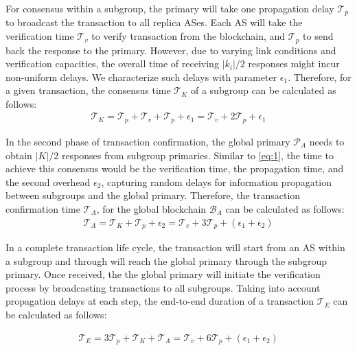\documentclass[conference]{IEEEtran}
\begin{document}
For consensus within a subgroup, the primary will take one propagation delay $\mathcal{T}_{p}$ to broadcast the transaction to all replica ASes. Each AS will take the verification time $\mathcal{T}_{v}$ to verify transaction from the blockchain, and $\mathcal{T}_{p}$ to send back the response to the primary. However, due to varying link conditions and verification capacities, the overall time of receiving $|k_{i}|/2$ responses might incur non-uniform delays. We characterize such delays with parameter  $\epsilon_{1}$. Therefore, for a given transaction, the consensus time $\mathcal{T}_{K}$ of a subgroup can be calculated as follows: 
\begin{align} \label{eq:1}
    \mathcal{T}_{K} = \mathcal{T}_{p} +  \mathcal{T}_{v} + \mathcal{T}_{p} + \epsilon_{1} = \mathcal{T}_{v} + 2\mathcal{T}_{p} + \epsilon_{1}
\end{align}


In the second phase of transaction confirmation, the global primary $\mathcal{P}_{A}$ needs to obtain $|K|/2$ responses from subgroup primaries. Similar to \autoref{eq:1}, the time to achieve this consensus would be the verification time, the propagation time, and the second overhead $\epsilon_{2}$, capturing random delays for information propagation between subgroups and the global primary. Therefore, the transaction confirmation time $\mathcal{T}_{A}$, for the global blockchain $\mathcal{B}_{A}$ can be calculated as follows:
\begin{align}\label{eq:2}
    \mathcal{T}_{A} = \mathcal{T}_{K}+ \mathcal{T}_{p}+\epsilon_{2} = \mathcal{T}_{v} + 3\mathcal{T}_{p} + (\epsilon_{1}+\epsilon_{2})
\end{align}



In a complete transaction life cycle, the transaction will start from an AS within a subgroup and through will reach the global primary through the subgroup primary. Once received, the the global primary will initiate the verification process by broadcasting transactions to all subgroups. Taking into account propagation delays at each step, the end-to-end duration of a transaction $\mathcal{T}_{E}$ can be calculated as follows: 

\begin{align}\label{eq:3}
    \mathcal{T}_{E} = 3\mathcal{T}_{p} +\mathcal{T}_{K}+ \mathcal{T}_{A} = \mathcal{T}_{v} + 6\mathcal{T}_{p} + (\epsilon_{1}+\epsilon_{2})
\end{align}

 
\end{document}
